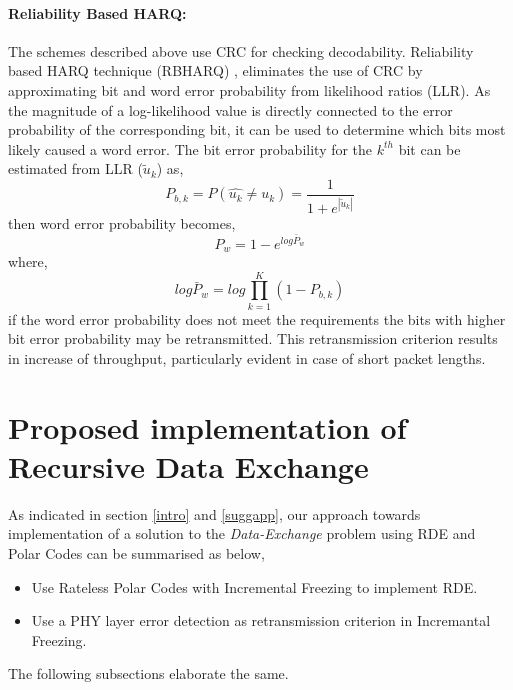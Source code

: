 \documentclass[
11pt, %
a4paper, %
oneside, %
headinclude,footinclude, %
BCOR5mm, %
]{scrartcl}
\begin{document}
\paragraph{Reliability Based HARQ:}
The schemes described above use CRC for checking decodability. Reliability based HARQ technique (RBHARQ) \cite{rbharq}, eliminates the use of CRC by approximating bit and word error probability from likelihood ratios (LLR).  As the magnitude of a log-likelihood value is directly
connected to the error probability of the corresponding
bit, it can be used to determine which bits most
likely caused a word error. The bit error probability for the $k^{th}$ bit can be estimated from LLR ($\tilde{u}_k$) as,
\begin{equation}\label{eq:errorllr}
P_{b,k}=P(\hat{u_k} \neq u_k) = \frac{1}{1+e^{|\tilde{u}_k|}}
\end{equation}
then word error probability becomes, 
\begin{equation}
P_w=1-e^{log\bar{P}_w}
\end{equation}
where, $$log\bar{P}_w=log\prod_{k=1}^K (1- P_{b,k})$$ 
if the word error probability does not meet the requirements the bits with higher bit error probability may be retransmitted. This retransmission criterion results in increase of throughput, particularly evident in case of short packet lengths.



\newpage
\section{Proposed implementation of Recursive Data Exchange} \label{propsol}
As indicated in section \ref{intro} and \ref{suggapp}, our approach towards implementation of a solution to the \emph{Data-Exchange} problem using RDE and Polar Codes can be summarised as below, 
\begin{itemize}
\item{Use Rateless Polar Codes with Incremental Freezing to implement RDE.}
\item{Use a PHY layer error detection as retransmission criterion in Incremantal Freezing.}
\end{itemize}
The following subsections elaborate the same.
\end{document}
